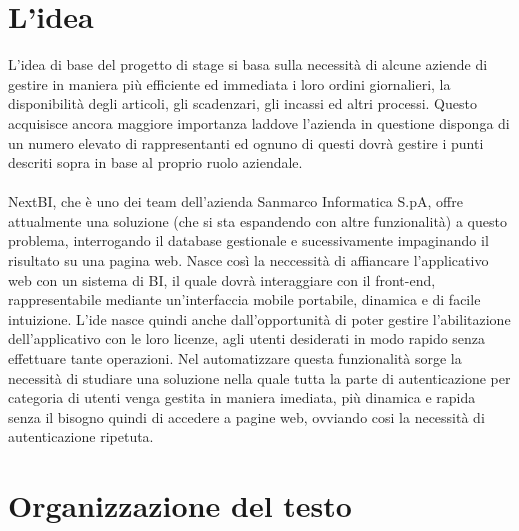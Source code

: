 \section{L'idea}

L'idea di base del progetto di stage si basa sulla necessità di alcune aziende di gestire in maniera più efficiente ed immediata i loro ordini giornalieri, la disponibilità degli articoli, gli scadenzari, gli incassi ed altri processi. Questo acquisisce ancora maggiore importanza laddove l'azienda in questione disponga di un numero elevato di rappresentanti ed ognuno di questi dovrà gestire i punti descriti sopra in base al proprio ruolo aziendale. \\ \\

NextBI, che è uno dei team dell'azienda Sanmarco Informatica S.pA, offre attualmente una soluzione (che si sta espandendo con altre funzionalità) a questo problema, interrogando il database  gestionale e sucessivamente impaginando il risultato su una pagina web. Nasce così la neccessità di affiancare l'applicativo web con un sistema di BI, il quale dovrà interaggiare con il front-end, rappresentabile mediante un'interfaccia mobile portabile, dinamica e di facile intuizione. L'ide nasce quindi anche dall'opportunità di poter gestire l'abilitazione dell'applicativo con le loro licenze, agli utenti desiderati in modo rapido senza effettuare tante operazioni. Nel automatizzare questa funzionalità sorge la necessità di studiare una soluzione nella quale tutta la parte di autenticazione per categoria di utenti venga gestita in maniera imediata, più dinamica e rapida senza il bisogno quindi di accedere a pagine web, ovviando cosi la necessità di autenticazione ripetuta.

\section{Organizzazione del testo}

